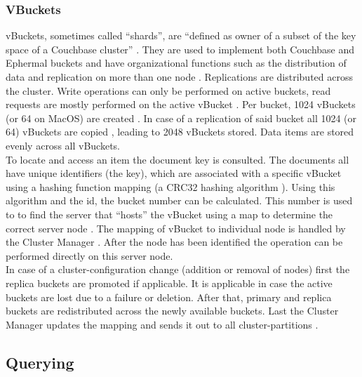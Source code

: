\subsubsection{VBuckets}
vBuckets, sometimes called “shards”, are “defined as owner of a subset of the key space of a Couchbase cluster” \parencite{objelean} \parencite{couchbaseDocuVbuckets}. They are used to implement both Couchbase and Ephermal buckets \parencite{couchbaseDocuVbuckets} and have organizational functions such as the distribution of data and replication on more than one node \parencite{objelean} \parencite{couchbaseDocuVbuckets}. Replications are distributed across the cluster. Write operations can only be performed on active buckets, read requests are mostly performed on the active vBucket \parencite{couchbaseDocuVbuckets}. Per bucket, 1024 vBuckets (or 64 on MacOS) are created \parencite{couchbaseDocuVbuckets}. In case of a replication of said bucket all 1024 (or 64) vBuckets are copied \parencite{couchbaseDocuVbuckets}, leading to 2048 vBuckets stored.  Data items are stored evenly across all vBuckets. \\
To locate and access an item the document key is consulted. The documents all have unique identifiers (the key), which are associated with a specific vBucket using a hashing function mapping \parencite{objelean} (a CRC32 hashing algorithm \parencite{couchbaseDocuVbuckets}). Using this algorithm and the id, the bucket number can be calculated. This number is used to to find the server that “hosts” the vBucket using a map to determine the correct server node \parencite{couchbaseDocuVbuckets}. The mapping of vBucket to individual node is handled by the Cluster Manager \parencite{couchbaseDocuVbuckets}. After the node has been identified the operation can be performed directly on this server node. \\
In case of a cluster-configuration change (addition or removal of nodes) first the replica buckets are promoted if applicable. It is applicable in case the active buckets are lost due to a failure or deletion. After that, primary and replica buckets are redistributed across the newly available buckets. Last the Cluster Manager updates the mapping and sends it out to all cluster-partitions \parencite{couchbaseDocuVbuckets}.

\subsection{Querying}
